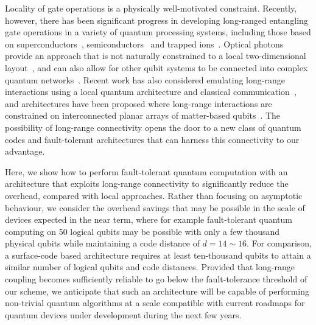 \documentclass[reprint,
superscriptaddress,
 amsmath,amssymb,
 aps, longbibliography
]{revtex4-1}
\newcommand{\rev}[1]{{#1}}
\begin{document}
Locality of gate operations is a physically well-motivated constraint.  Recently, however, there has been significant progress in developing long-ranged entangling gate operations in a variety of quantum processing systems, including those based on superconductors~\cite{Magnard2020}, semiconductors~\cite{Mills2019,Borjans2020,yoneda2021coherent} and trapped ions~\cite{debnath2016demonstration,pino2021demonstration}. Optical photons provide an approach that is not naturally constrained to a local two-dimensional layout~\cite{bombin2021interleaving,bartolucci2021fusion}, and can also allow for other qubit systems to be connected into complex quantum networks~\cite{Barrett05,Nickerson13,Kalb17,Stephenson20}. \rev{Recent work has also considered emulating long-range interactions using a local quantum architecture and classical communication~\cite{delfosse2021bounds}, and architectures have been proposed where long-range interactions are constrained on interconnected planar arrays of matter-based qubits~\cite{tremblay2021constantoverhead}.} The possibility of long-range connectivity opens the door to a new class of quantum codes and fault-tolerant architectures that can harness this connectivity to our advantage.



Here, we show how to perform fault-tolerant quantum computation with an architecture that exploits long-range connectivity to significantly reduce the overhead, compared with local approaches.  Rather than focusing on asymptotic behaviour, we consider the overhead savings that may be possible in the scale of devices expected in the near term, where for example fault-tolerant quantum computing on 50 logical qubits may be possible with only a few thousand physical qubits while maintaining a code distance of $d=14\sim 16$. For comparison, a surface-code based architecture requires at least ten-thousand qubits to attain a similar number of logical qubits and code distances.
Provided that long-range coupling becomes sufficiently reliable to go below the fault-tolerance threshold of our scheme, we anticipate that such an architecture will be capable of performing non-trivial quantum algorithms at a scale compatible with current roadmaps for quantum devices under development during the next few years.
\end{document}
